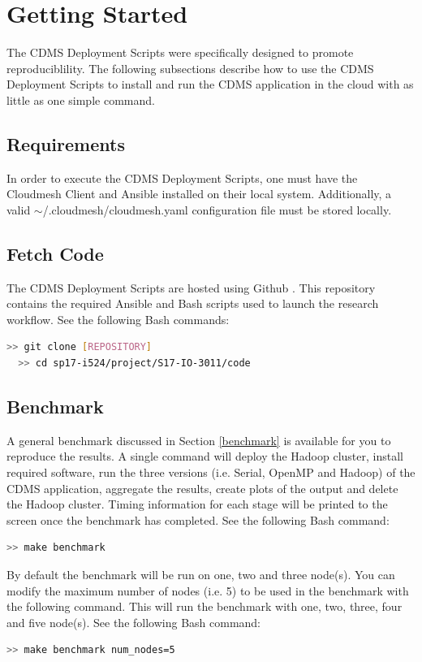 \documentclass[9pt,twocolumn,twoside]{../../styles/osajnl}
\begin{document}
\section{Getting Started}
The CDMS Deployment Scripts were specifically designed to promote
reproduciblility. The following subsections describe how to use the
CDMS Deployment Scripts to install and run the CDMS application in the
cloud with as little as one simple command.
\subsection{Requirements} \label{req}
In order to execute the CDMS Deployment Scripts, one must have the
Cloudmesh Client and Ansible installed on their local
system. Additionally, a valid $\sim$/.cloudmesh/cloudmesh.yaml
configuration file must be stored locally.
\subsection{Fetch Code} \label{git}
The CDMS Deployment Scripts are hosted using Github
\cite{i524-github}. This repository contains the required Ansible and
Bash scripts used to launch the research workflow.
\noindent See the following Bash commands:
\begin{lstlisting}[language=bash]
  >> git clone [REPOSITORY]
  >> cd sp17-i524/project/S17-IO-3011/code
\end{lstlisting}
\subsection{Benchmark} \label{benchmark-info}
A general benchmark discussed in Section \ref{benchmark} is available for
you to reproduce the results. A single command will deploy the Hadoop
cluster, install required software, run the three versions
(i.e. Serial, OpenMP and Hadoop) of the CDMS application, aggregate
the results, create plots of the output and delete the Hadoop
cluster. Timing information for each stage will be printed to the
screen once the benchmark has completed.
\noindent See the following Bash command:
\begin{lstlisting}[language=bash]
  >> make benchmark
\end{lstlisting}
By default the benchmark will be run on one, two and three
node(s). You can modify the maximum number of nodes (i.e. 5) to be
used in the benchmark with the following command. This will run the
benchmark with one, two, three, four and five node(s).
\noindent See the following Bash command:
\begin{lstlisting}[language=bash]
  >> make benchmark num_nodes=5
\end{lstlisting}
\end{document}
